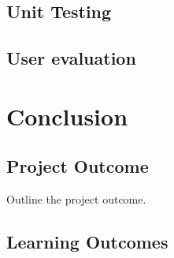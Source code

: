 \documentclass{4thYearProject}
\begin{document}
\section{Unit Testing}
\section{User evaluation}\label{sec:usereval}

\chapter{Conclusion}

\section{Project Outcome}

Outline the project outcome. 

\section{Learning Outcomes}







\begin{appendices}
\end{appendices}
\end{document}
